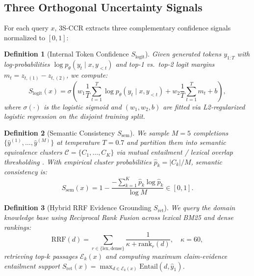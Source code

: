 \documentclass[10pt,conference]{IEEEtran}
\newtheorem{definition}{Definition}
\begin{document}
\subsection{Three Orthogonal Uncertainty Signals}
For each query $x$, 3S-CCR extracts three complementary confidence signals normalized to $[0, 1]$:

\begin{definition}[Internal Token Confidence $S_{\text{logit}}$]
Given generated tokens $y_{1:T}$ with log-probabilities $\log p_\theta(y_t \mid x, y_{<t})$ and top-1 vs.\ top-2 logit margins $m_t = z_{t,(1)} - z_{t,(2)}$, we compute:
\begin{equation}
    S_{\text{logit}}(x) = \sigma\!\left(w_1 \frac{1}{T}\sum_{t=1}^{T} \log p_\theta(y_t \mid x, y_{<t}) + w_2 \frac{1}{T}\sum_{t=1}^{T} m_t + b\right),
\end{equation}
where $\sigma(\cdot)$ is the logistic sigmoid and $(w_1, w_2, b)$ are fitted via L2-regularized logistic regression on the disjoint training split.
\end{definition}

\begin{definition}[Semantic Consistency $S_{\text{sem}}$]
We sample $M=5$ completions $\{\hat{y}^{(1)}, \dots, \hat{y}^{(M)}\}$ at temperature $T=0.7$ and partition them into semantic equivalence clusters $\mathcal{C} = \{C_1, \dots, C_K\}$ via mutual entailment / lexical overlap thresholding \cite{kuhn2023semantic}. With empirical cluster probabilities $\hat{p}_k = |C_k|/M$, semantic consistency is:
\begin{equation}
    S_{\text{sem}}(x) = 1 - \frac{-\sum_{k=1}^{K} \hat{p}_k \log \hat{p}_k}{\log M} \in [0, 1].
\end{equation}
\end{definition}

\begin{definition}[Hybrid RRF Evidence Grounding $S_{\text{ret}}$]
We query the domain knowledge base using Reciprocal Rank Fusion \cite{cormack2009rrf} across lexical BM25 \cite{robertson2009probabilistic} and dense \cite{karpukhin2020dense} rankings:
\begin{equation}
    \mathrm{RRF}(d) = \sum_{r \in \{\text{lex}, \text{dense}\}} \frac{1}{\kappa + \mathrm{rank}_r(d)}, \quad \kappa = 60,
\end{equation}
retrieving top-$k$ passages $\mathcal{E}_k(x)$ and computing maximum claim-evidence entailment support $S_{\text{ret}}(x) = \max_{d \in \mathcal{E}_k(x)} \mathrm{Entail}(d, \hat{y}_1)$.
\end{definition}
\end{document}

